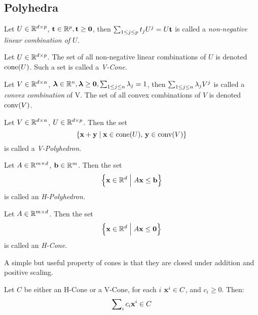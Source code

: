 \chapter{\MWT}

\section{Polyhedra}

\begin{Def}{
  Let $U \in \mathbb{R}^{d\times p}$, $\mathbf{t} \in \mathbb{R}^{p}, \mathbf{t} \geq \mathbf{0}$, then \( \sum_{1\leq j \leq p}t_j U^j = U\mathbf{t}\) is called a \em{non-negative linear combination} of $U$.
}\end{Def}

\begin{Def}[V-Cone]{
  Let $U \in \mathbb{R}^{d\times p}$.  The set of all non-negative linear combinations of $U$ is denoted $\operatorname{cone}(U)$.  Such a set is called a \em{V-Cone}.
}\end{Def} 

\begin{Def}{
  Let $V \in \mathbb{R}^{d\times n}$, $\bm{\lambda} \in \mathbb{R}^{n}, \bm{\lambda} \geq\mathbf{0}, \sum_{1\leq j \leq n}\lambda_j = 1$, then \( \sum_{1\leq j \leq n}\lambda_j V^j \) is called a \textit{convex combination} of V.  The set of all convex combinations of $V$ is denoted $\operatorname{conv}(V)$.
}\end{Def}

\begin{Def}[V-Polyhedron]{
  Let $V \in \mathbb{R}^{d\times n}$, $U \in \mathbb{R}^{d\times p}$.  Then the set
  \[ \left\{\mathbf{x} + \mathbf{y} \;|\; \mathbf{x} \in \operatorname{cone}(U),\, \mathbf{y} \in \operatorname{conv}(V)\right\} \]
  is called a \em{V-Polyhedron}.
}\end{Def}

\begin{Def}[H-Polyhedron]{
  Let $A \in \mathbb{R}^{{m}\times d}$, $\mathbf{b} \in \mathbb{R}^{m}$.  Then the set
  \[ \left\{\mathbf{x} \in \mathbb{R}^d \;\Big|\; A\mathbf{x} \leq \mathbf{b}\right\} \]
  is called an \em{H-Polyhedron}.
}\end{Def}

\begin{Def}[H-Cone]{
  Let $A \in \mathbb{R}^{{m}\times d}$. Then the set
  \[ \left\{\mathbf{x} \in \mathbb{R}^d \;\Big|\; A\mathbf{x} \leq \mathbf{0}\right\} \]
  is called an \em{H-Cone}.
}\end{Def}

A simple but useful property of cones is that they are closed under addition and positive scaling.

\begin{Prop}\label{prop:closure}
  Let $C$ be either an H-Cone or a V-Cone, for each $i$ $\mathbf{x}^i \in C$, and $c_i \geq 0$.  Then:
  \[ \sum\nolimits_i c_i \mathbf{x}^i \in C \]
\end{Prop}

